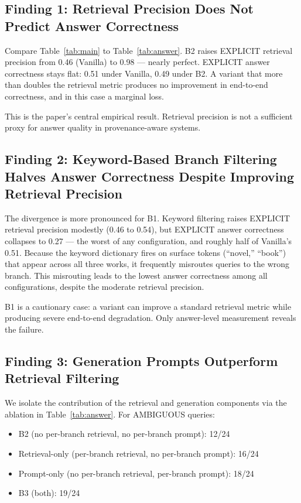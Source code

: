 \documentclass[conference]{IEEEtran}
\begin{document}
\subsection{Finding 1: Retrieval Precision Does Not Predict Answer Correctness}
\label{sec:finding1}

Compare Table~\ref{tab:main} to Table~\ref{tab:answer}. B2 raises EXPLICIT retrieval precision from 0.46 (Vanilla) to 0.98 --- nearly perfect. EXPLICIT answer correctness stays flat: 0.51 under Vanilla, 0.49 under B2. A variant that more than doubles the retrieval metric produces no improvement in end-to-end correctness, and in this case a marginal loss.

This is the paper's central empirical result. Retrieval precision is not a sufficient proxy for answer quality in provenance-aware systems.

\subsection{Finding 2: Keyword-Based Branch Filtering Halves Answer Correctness Despite Improving Retrieval Precision}

The divergence is more pronounced for B1. Keyword filtering raises EXPLICIT retrieval precision modestly (0.46 to 0.54), but EXPLICIT answer correctness collapses to 0.27 --- the worst of any configuration, and roughly half of Vanilla's 0.51. Because the keyword dictionary fires on surface tokens (``novel,'' ``book'') that appear across all three works, it frequently misroutes queries to the wrong branch. This misrouting leads to the lowest answer correctness among all configurations, despite the moderate retrieval precision.

B1 is a cautionary case: a variant can improve a standard retrieval metric while producing severe end-to-end degradation. Only answer-level measurement reveals the failure.

\subsection{Finding 3: Generation Prompts Outperform Retrieval Filtering}
\label{sec:finding3}

We isolate the contribution of the retrieval and generation components via the ablation in Table~\ref{tab:answer}. For AMBIGUOUS queries:

\begin{itemize}
\item B2 (no per-branch retrieval, no per-branch prompt): 12/24
\item Retrieval-only (per-branch retrieval, no per-branch prompt): 16/24
\item Prompt-only (no per-branch retrieval, per-branch prompt): 18/24
\item B3 (both): 19/24
\end{itemize}
\end{document}
